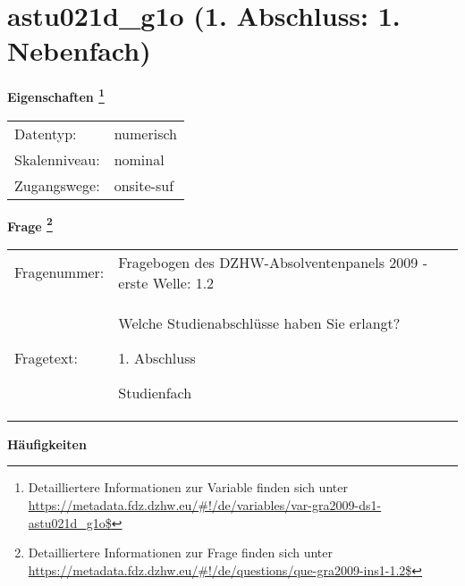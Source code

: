 
    \setcounter{footnote}{0}

    \vspace*{-1.8cm}
	\section{astu021d\_g1o (1. Abschluss: 1. Nebenfach)}
	\label{section:astu021d_g1o}



    \vspace*{0.5cm}
    \noindent\textbf{Eigenschaften
	\footnote{Detailliertere Informationen zur Variable finden sich unter
		\url{https://metadata.fdz.dzhw.eu/\#!/de/variables/var-gra2009-ds1-astu021d_g1o$}}}\\
	\begin{tabularx}{\hsize}{@{}lX}
	Datentyp: & numerisch \\
	Skalenniveau: & nominal \\
	Zugangswege: &
	  onsite-suf
 \\
    \end{tabularx}



				\vspace*{0.5cm}
                \noindent\textbf{Frage
	                \footnote{Detailliertere Informationen zur Frage finden sich unter
		              \url{https://metadata.fdz.dzhw.eu/\#!/de/questions/que-gra2009-ins1-1.2$}}}\\
				\begin{tabularx}{\hsize}{@{}lX}
					Fragenummer: &
					  Fragebogen des DZHW-Absolventenpanels 2009 - erste Welle:
					  1.2
 \\
					Fragetext: & Welche Studienabschlüsse haben Sie erlangt?\par  1. Abschluss\par  Studienfach \\
				\end{tabularx}





        		\vspace*{0.5cm}
                \noindent\textbf{Häufigkeiten}

